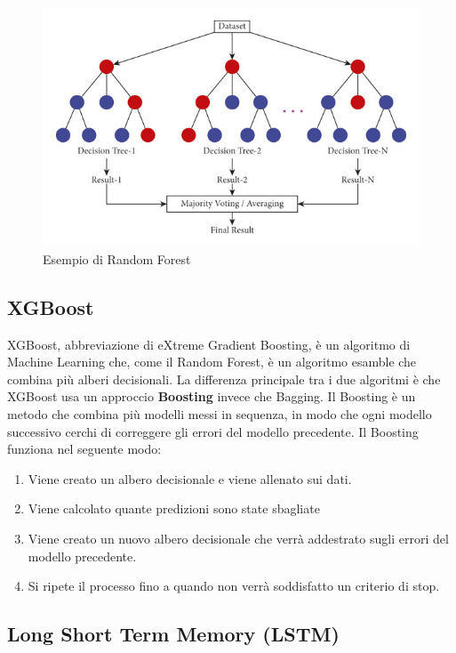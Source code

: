 \documentclass[12pt,a4paper,openright,twoside]{book}
\begin{document}
\begin{figure}
    \centering
    \includegraphics[width=.8\linewidth]{figures/Illustration-of-random-forest-trees.jpg}
    \caption{Esempio di Random Forest \cite{RFIMAGE}}
    \label{fig:random forest}
\end{figure}



\subsection{XGBoost}
XGBoost, abbreviazione di eXtreme Gradient Boosting, è un algoritmo di Machine Learning
che, come il Random Forest, è un algoritmo esamble che combina più alberi decisionali.
La differenza principale tra i due algoritmi è che XGBoost usa un approccio
\textbf{Boosting} invece che Bagging.
Il Boosting è un metodo che combina più modelli
messi in sequenza, in modo che ogni modello successivo
cerchi di correggere gli errori del modello precedente.
\cite{Xgboost2016}
Il Boosting funziona nel seguente modo:
\begin{enumerate}
    \item Viene creato un albero decisionale e viene allenato sui dati.
    \item Viene calcolato quante predizioni sono state sbagliate
    \item Viene creato un nuovo albero decisionale che verrà addestrato sugli errori del modello precedente.
    \item Si ripete il processo fino a quando non verrà soddisfatto un criterio di stop.
\end{enumerate}




\subsection{Long Short Term Memory (LSTM)}
\end{document}
